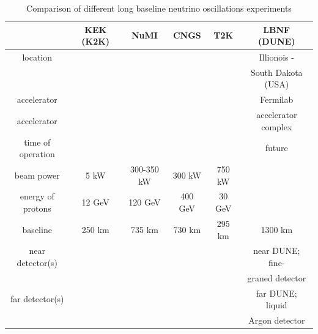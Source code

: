 \begin{table}[h]
  \centering
  \begin{center}
  \caption{ Comparison of different long baseline neutrino oscillations experiments}
  \begin{tabular}{|c|c|c|c|c|c|}
              & KEK (K2K) & NuMI & CNGS & T2K & LBNF (DUNE)\\ \hline
     location &   &  &  &  & Illionois - \\ 
              &   &  &  &  & South Dakota (USA)\\ \hline
     accelerator &   &  &  &  & Fermilab\\ 
     accelerator &   &  &  &  & accelerator complex\\ \hline
     time of operation &   &  &  &  & future \\ \hline 
     beam power  &  5 kW  & 300-350 kW  & 300 kW & 750 kW & \\ \hline 
     energy of protons  & 12 GeV & 120 GeV & 400 GeV & 30 GeV & \\ \hline 
     baseline  & 250 km & 735 km & 730 km & 295 km & 1300 km\\ \hline 
     near detector(s)  &   &  &  &  & near DUNE; fine-\\  
                       &   &  &  &  & graned detector\\ \hline 
     far detector(s)  &   &  &  &  & far DUNE; liquid\\  
                      &   &  &  &  & Argon detector\\ \hline 
 \end{tabular}
  \label{tab:compareExps}
  \end{center}
\end{table}



